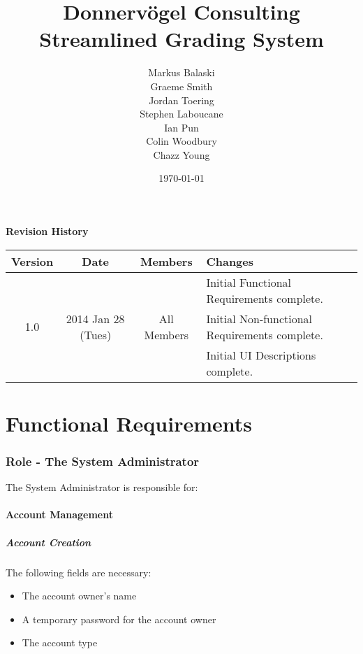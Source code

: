 \documentclass{article}
\begin{document}
\title{Donnervögel Consulting \\ Streamlined Grading System}
\author{Markus Balaski \\ Graeme Smith \\ Jordan Toering \\ Stephen Laboucane \\ Ian Pun \\ Colin Woodbury \\ Chazz Young}
\date{\today}
\maketitle
\clearpage

\textbf{Revision History}
\begin{center}
  \begin{tabular}{| c | c | c | l |}
    \hline
    Version & Date & Members & Changes\\
    \hline
    & & & Initial Functional Requirements complete.\\
    1.0 & 2014 Jan 28 (Tues) & All Members & Initial Non-functional Requirements complete.\\
    & & & Initial UI Descriptions complete.\\
    \hline
  \end{tabular}
\end{center}
\clearpage

\tableofcontents
\clearpage

\part{Functional Requirements}
\section{Role - The System Administrator \label{SysAdmin}}
The System Administrator is responsible for:
\subsection{Account Management}
\subsubsection{Account Creation}
The following fields are necessary:
\begin{itemize}
  \item The account owner's name
  \item A temporary password for the account owner
  \item The account type
\end{itemize}
\end{document}
